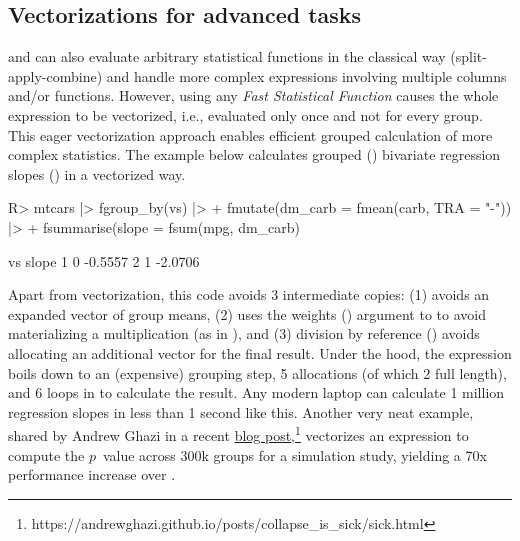 \documentclass[nojss]{jss} %
\newcommand{\fct}[1]{\code{#1()}}
\begin{document}
\subsection{Vectorizations for advanced tasks} \label{ssec:vfat}
%
\fct{fsummarise} and \fct{fmutate} can also evaluate arbitrary statistical functions in the classical way (split-apply-combine) and handle more complex expressions involving multiple columns and/or functions. However, using any \emph{Fast Statistical Function} causes the whole expression to be vectorized, i.e., evaluated only once and not for every group. This eager vectorization approach enables efficient grouped calculation of more complex statistics. The example below calculates grouped () bivariate regression slopes () in a vectorized way.
%
\begin{Schunk}
\begin{Sinput}
R> mtcars |> fgroup_by(vs) |>
+   fmutate(dm_carb = fmean(carb, TRA = "-")) |>
+   fsummarise(slope = fsum(mpg, dm_carb) %/=% fsum(dm_carb^2))
\end{Sinput}
\begin{Soutput}
  vs   slope
1  0 -0.5557
2  1 -2.0706
\end{Soutput}
\end{Schunk}
%
Apart from vectorization, this code avoids 3 intermediate copies: (1)  avoids an expanded vector of group means, (2)  uses the weights () argument to \fct{fsum} to avoid materializing a multiplication (as in ), and (3) division by reference (\code{\%/=\%}) avoids allocating an additional vector for the final result. Under the hood, the expression boils down to an (expensive) grouping step, 5 allocations (of which 2 full length), and 6 loops in  to calculate the result. Any modern laptop can calculate 1 million regression slopes in less than 1 second like this. Another very neat example, shared by Andrew Ghazi in a recent \href{https://andrewghazi.github.io/posts/collapse\_is\_sick/sick.html}{blog post},\footnote{https://andrewghazi.github.io/posts/collapse\_is\_sick/sick.html} vectorizes an expression to compute the $p$~value across 300k groups for a simulation study, yielding a 70x performance increase over . \newline
\end{document}
